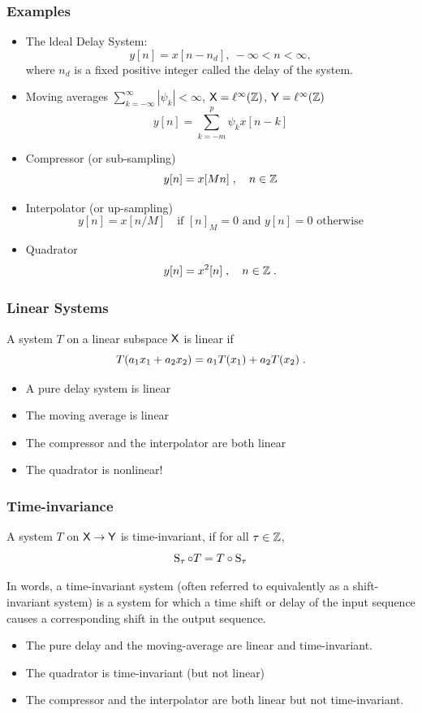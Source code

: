 \begin{frame}
\frametitle{Examples}
\begin{itemize}
\item \alert{The ldeal Delay System}:
$$
y[n]=x[n-n_{d}],\ -\infty<n<\infty,
$$
where $n_{d}$ is a fixed positive integer called the delay of the system.
\item \alert{Moving averages} $\sum_{k=-\infty}^{\infty} |\psi_k| < \infty$, $\mathsf{X}= \ell^\infty(\mathbb{Z})$, $\mathsf{Y}= \ell^\infty(\mathbb{Z})$
$$
y[n]= \sum_{k=-m}^p \psi_k x[n-k]
$$
\item \alert{Compressor} (or sub-sampling)
$$
y[n]= x[Mn] \;, \quad n \in \mathbb{Z}
$$
\item \alert{Interpolator} (or up-sampling)
$$
y[n]= x[n/M] \quad \text{if $[n]_M= 0$ and $y[n]=0$ otherwise}
$$
\item \alert{Quadrator}
$$
y[n]= x^2[n] \;, \quad n \in \mathbb{Z} \;.
$$
\end{itemize}
\end{frame}

\begin{frame}
\frametitle{Linear Systems}
\begin{definition}
A system $T$ on a linear subspace $\mathsf{X}$ is linear if
$$
T( a_1 x_{1}+a_2 x_{2})=a_1 T(x_1) + a_2 T(x_2) \;.
$$
\end{definition}
\begin{itemize}
\item A pure delay system is linear
\item The moving average is linear
\item The compressor and the interpolator are both linear
\item The quadrator is nonlinear!
\end{itemize}
\end{frame}

\begin{frame}
\frametitle{Time-invariance}
\begin{definition}
A system $T$ on $\mathsf{X} \to \mathsf{Y}$ is \alert{time-invariant}, if for all $\tau \in \mathbb{Z}$,
\alert{
$$
\operatorname{S}_{\tau} \circ T = T \circ \operatorname{S}_\tau
$$
}
\end{definition}
In words, a time-invariant system (often referred to equivalently as a shift-invariant system) is a system for which a time shift or delay of the input sequence causes a corresponding shift in the output sequence.
\begin{itemize}
\item The pure delay and the moving-average are linear and time-invariant.
\item The quadrator is time-invariant (but not linear)
\item The compressor and the interpolator are both linear but not time-invariant.
\end{itemize}
\end{frame}



